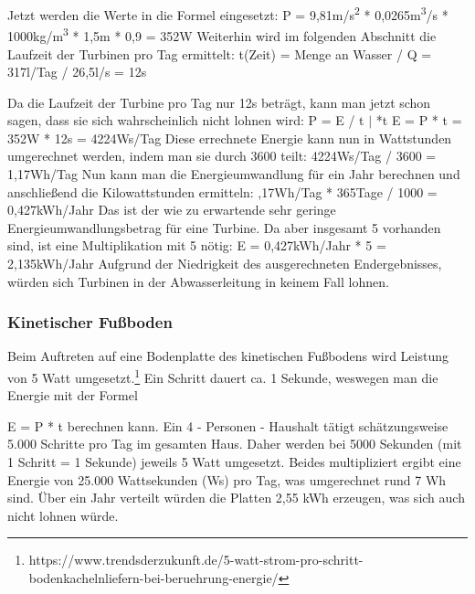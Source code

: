 \newline
Jetzt werden die Werte in die Formel eingesetzt:
\newline
P = 9,81m/s\textsuperscript{2} * 0,0265m\textsuperscript{3}/s * 1000kg/m\textsuperscript{3} *
1,5m * 0,9 = 352W
\newline
Weiterhin wird im folgenden Abschnitt die Laufzeit der Turbinen pro Tag ermittelt:
\newline
t(Zeit) = Menge an Wasser / Q = 317l/Tag / 26,5l/s = 12s
\newline
\par
Da die Laufzeit der Turbine pro Tag nur 12s beträgt, kann man jetzt schon sagen, dass sie sich
wahrscheinlich nicht lohnen wird:
\newline
P = E / t $\vert$ *t
\newline
E = P * t = 352W * 12s = 4224Ws/Tag
\newline
Diese errechnete Energie kann nun in Wattstunden umgerechnet werden, indem man sie durch
3600 teilt:
\newline
4224Ws/Tag / 3600 = 1,17Wh/Tag
\newline
Nun kann man die Energieumwandlung für ein Jahr berechnen und anschließend die
Kilowattstunden ermitteln:
,17Wh/Tag * 365Tage / 1000 = 0,427kWh/Jahr
\newline
Das ist der wie zu erwartende sehr geringe Energieumwandlungsbetrag für eine Turbine. Da aber
insgesamt 5 vorhanden sind, ist eine Multiplikation mit 5 nötig:
\newline
E = 0,427kWh/Jahr * 5 = 2,135kWh/Jahr
\newline
Aufgrund der Niedrigkeit des ausgerechneten Endergebnisses, würden sich Turbinen in der
Abwasserleitung in keinem Fall lohnen.
\subsubsection{Kinetischer Fußboden}
Beim Auftreten auf eine Bodenplatte des kinetischen Fußbodens wird Leistung von 5 Watt
umgesetzt.\footnote{https://www.trendsderzukunft.de/5-watt-strom-pro-schritt-bodenkachelnliefern-bei-beruehrung-energie/} Ein Schritt dauert ca. 1 Sekunde, weswegen man die Energie mit
der Formel \par E = P * t berechnen kann. Ein 4 - Personen - Haushalt tätigt schätzungsweise 5.000
Schritte pro Tag im gesamten Haus. Daher werden bei 5000 Sekunden (mit 1 Schritt = 1 Sekunde) jeweils 5 Watt umgesetzt. Beides
multipliziert ergibt eine Energie von 25.000 Wattsekunden (Ws) pro Tag, was umgerechnet rund
7 Wh sind. Über ein Jahr verteilt würden die Platten 2,55 kWh erzeugen, was sich auch nicht lohnen würde.
\newpage
